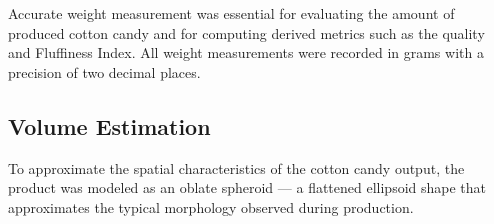 Accurate weight measurement was essential for evaluating the amount of produced cotton candy and for computing derived metrics such as the quality and Fluffiness Index. All weight measurements were recorded in grams with a precision of two decimal places.




\subsection{Volume Estimation}

To approximate the spatial characteristics of the cotton candy output, the product was modeled as an oblate spheroid — a flattened ellipsoid shape that approximates the typical morphology observed during production.


